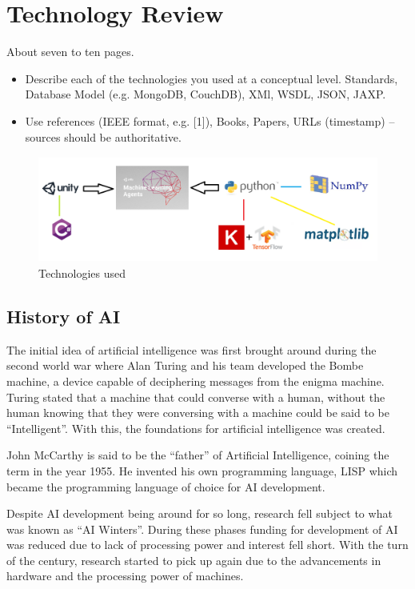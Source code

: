 
\chapter{Technology Review}
About seven to ten pages.
\begin{itemize}
    \item Describe each of the technologies you used at a conceptual level. Standards, Database Model (e.g. MongoDB, CouchDB), XMl, WSDL, JSON, JAXP.
    \item Use references (IEEE format, e.g. [1]), Books, Papers, URLs (timestamp) – sources should be authoritative.
\end{itemize}

\begin{figure}[H]
    \centering
    \includegraphics[width=130mm, height=35mm]{img/TechUsed.png}
    \caption{Technologies used}
    \label{fig:sd4}
\end{figure}

\section{History of AI}
The initial idea of artificial intelligence was first brought around during the second world war where Alan Turing and his team developed the Bombe machine, a device capable of deciphering messages from the enigma machine. Turing stated that a machine that could converse with a human, without the human knowing that they were conversing with a machine could be said to be “Intelligent”.  With this, the foundations for artificial intelligence was created. 

John McCarthy is said to be the “father” of Artificial Intelligence, coining the term in the year 1955. He invented his own programming language, LISP which became the programming language of choice for AI development. 

Despite AI development being around for so long, research fell subject to what was known as “AI Winters”. During these phases funding for development of AI was reduced due to lack of processing power and interest fell short. With the turn of the century, research started to pick up again due to the advancements in hardware and the processing power of machines.

